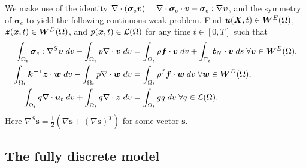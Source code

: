 We make use of the identity $\nabla \cdot ( \boldsymbol{\sigma}_{e} \boldsymbol{v})= \nabla \cdot \boldsymbol{\sigma}_{e} \cdot \boldsymbol{v} -  \boldsymbol{\sigma}_{e} : \nabla \boldsymbol{v} $, and  the symmetry of $\boldsymbol{\sigma}_{e}$ to yield the following continuous weak problem. Find $\boldsymbol{u}(\boldsymbol{X},t) \in \boldsymbol{W}^{E}(\Omega)$, $\boldsymbol{z}(\boldsymbol{x},t) \in \boldsymbol{W}^{D}(\Omega)$, and $p(\boldsymbol{x},t) \in \mathcal{L}(\Omega)$ for any time $t\in[0,T]$ such that
\begin{equation}
\label{eqns:weak_cont_system}
\begin{aligned}
\int_{\Omega_{t}}  \boldsymbol{\sigma}_{e}
                : \nabla^{S} \boldsymbol{v}    \; dv
 - \int_{\Omega_{t}}  p   \nabla \cdot \boldsymbol{v}  \; dv
&= \int_{\Omega_{t}}  \rho \boldsymbol{f} \cdot \boldsymbol{v}  \; dv
 + \int_{\Gamma_{t}} \boldsymbol{t}_{N} \cdot \boldsymbol{v}  \; ds \; \forall \boldsymbol{v}\in \boldsymbol{W}^{E}(\Omega), \\
\int_{\Omega_{t}} \boldsymbol{k^{-1}} \boldsymbol{z} \cdot \boldsymbol{w} \; dv
  - \int_{\Omega_{t}}  p  \nabla \cdot\boldsymbol{w} \; dv
&= \int_{\Omega_{t}} \rho^{f} \boldsymbol{f} \cdot \boldsymbol{w} \; dv \; \forall\boldsymbol{w}\in \boldsymbol{W}^{D}(\Omega),  \\
\int_{\Omega_{t}} {q} \nabla \cdot  {\boldsymbol{u}_{t}} \; dv
 + \int_{\Omega_{t}} {q} \nabla \cdot \boldsymbol{z} \; dv
&= \int_{\Omega_{t}} g   {q} \; dv  \; \forall {q} \in \mathcal{L}(\Omega).
\end{aligned}
\end{equation}
Here $ \nabla^{S} \boldsymbol{s}=\frac{1}{2}\left( \nabla \boldsymbol{s} + (\nabla \boldsymbol{s})^{T} \right)$ for some vector $\boldsymbol{s}$.


\subsection{The fully discrete model}
\label{sec:fully_discrete}

